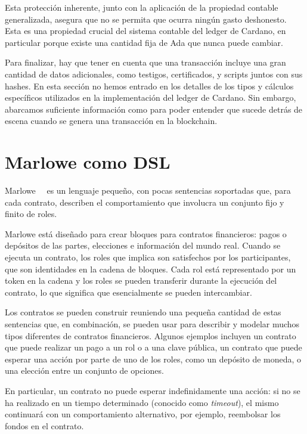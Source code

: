 \documentclass[12pt]{book}
\begin{document}
Esta protección inherente, junto con la aplicación de la propiedad contable generalizada, asegura que no se permita que ocurra ningún gasto deshonesto. Esta es una propiedad crucial del sistema contable del ledger de Cardano, en particular porque existe una cantidad fija de Ada que nunca puede cambiar.

Para finalizar, hay que tener en cuenta que una transacción incluye una gran cantidad de datos adicionales, como testigos, certificados, y scripts juntos con sus hashes. En esta sección no hemos entrado en los detalles de los tipos y cálculos específicos utilizados en la implementación del ledger de Cardano. Sin embargo, abarcamos suficiente información como para poder entender que sucede detrás de escena cuando se genera una transacción en la blockchain.


\section{Marlowe como DSL}
Marlowe~\cite{implementing_financial_contracts_on_blockchain}~\cite{standardized_crypto_loans} es un lenguaje pequeño, con pocas sentencias soportadas que, para cada contrato, describen el comportamiento que involucra un conjunto fijo y finito de roles.

Marlowe está diseñado para crear bloques para contratos financieros: pagos o depósitos de las partes, elecciones e información del mundo real. Cuando se ejecuta un contrato, los roles que implica son satisfechos por los participantes, que son identidades en la cadena de bloques. Cada rol está representado por un token en la cadena y los roles se pueden transferir durante la ejecución del contrato, lo que significa que esencialmente se pueden intercambiar.

Los contratos se pueden construir reuniendo una pequeña cantidad de estas sentencias que, en combinación, se pueden usar para describir y modelar muchos tipos diferentes de contratos financieros. Algunos ejemplos incluyen un contrato que puede realizar un pago a un rol o a una clave pública, un contrato que puede esperar una acción por parte de uno de los roles, como un depósito de moneda, o una elección entre un conjunto de opciones.

En particular, un contrato no puede esperar indefinidamente una acción: si no se ha realizado en un tiempo determinado (conocido como \textit{timeout}), el mismo continuará con un comportamiento alternativo, por ejemplo, reembolsar los fondos en el contrato.
\end{document}
